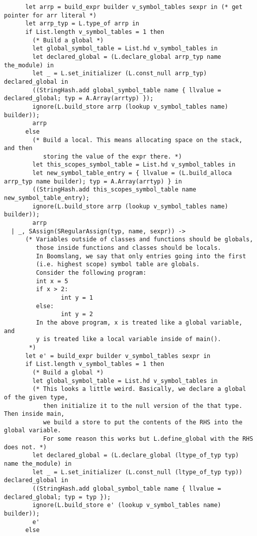 \documentclass{article}
\begin{document}
\begin{verbatim}
      let arrp = build_expr builder v_symbol_tables sexpr in (* get pointer for arr literal *)
      let arrp_typ = L.type_of arrp in
      if List.length v_symbol_tables = 1 then
        (* Build a global *)
        let global_symbol_table = List.hd v_symbol_tables in
        let declared_global = (L.declare_global arrp_typ name the_module) in
        let _ = L.set_initializer (L.const_null arrp_typ) declared_global in
        ((StringHash.add global_symbol_table name { llvalue = declared_global; typ = A.Array(arrtyp) });
        ignore(L.build_store arrp (lookup v_symbol_tables name) builder));
        arrp
      else
        (* Build a local. This means allocating space on the stack, and then
           storing the value of the expr there. *)
        let this_scopes_symbol_table = List.hd v_symbol_tables in
        let new_symbol_table_entry = { llvalue = (L.build_alloca arrp_typ name builder); typ = A.Array(arrtyp) } in
        ((StringHash.add this_scopes_symbol_table name new_symbol_table_entry);
        ignore(L.build_store arrp (lookup v_symbol_tables name) builder));
        arrp
  | _, SAssign(SRegularAssign(typ, name, sexpr)) ->
      (* Variables outside of classes and functions should be globals,
         those inside functions and classes should be locals.
         In Boomslang, we say that only entries going into the first
         (i.e. highest scope) symbol table are globals.
         Consider the following program:
         int x = 5
         if x > 2:
                int y = 1
         else:
                int y = 2
         In the above program, x is treated like a global variable, and
         y is treated like a local variable inside of main().
       *)
      let e' = build_expr builder v_symbol_tables sexpr in
      if List.length v_symbol_tables = 1 then
        (* Build a global *)
        let global_symbol_table = List.hd v_symbol_tables in
        (* This looks a little weird. Basically, we declare a global of the given type,
           then initialize it to the null version of the that type. Then inside main,
           we build a store to put the contents of the RHS into the global variable.
           For some reason this works but L.define_global with the RHS does not. *)
        let declared_global = (L.declare_global (ltype_of_typ typ) name the_module) in
        let _ = L.set_initializer (L.const_null (ltype_of_typ typ)) declared_global in
        ((StringHash.add global_symbol_table name { llvalue = declared_global; typ = typ });
        ignore(L.build_store e' (lookup v_symbol_tables name) builder));
        e'
      else

\end{verbatim}
\end{document}
